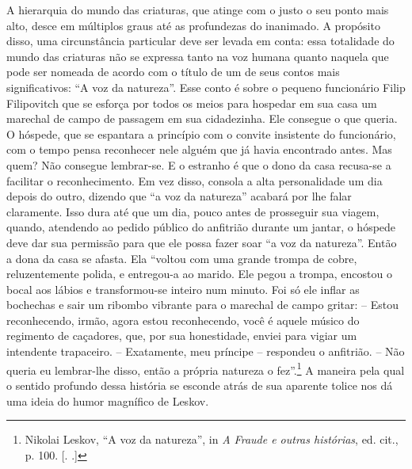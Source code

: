 A hierarquia do mundo das criaturas, que atinge com o justo o seu ponto
mais alto, desce em múltiplos graus até as profundezas do inanimado. A
propósito disso, uma circunstância particular deve ser levada em conta:
essa totalidade do mundo das criaturas não se expressa tanto na voz
humana quanto naquela que pode ser nomeada de acordo com o título de um
de seus contos mais significativos: ``A voz da natureza''. Esse conto é
sobre o pequeno funcionário Filip Filipovitch que se esforça por todos
os meios para hospedar em sua casa um marechal de campo de passagem em
sua cidadezinha. Ele consegue o que queria. O hóspede, que se espantara
a princípio com o convite insistente do funcionário, com o tempo pensa
reconhecer nele alguém que já havia encontrado antes. Mas quem? Não
consegue lembrar-se. E o estranho é que o dono da casa recusa-se a
facilitar o reconhecimento. Em vez disso, consola a alta personalidade
um dia depois do outro, dizendo que ``a voz da natureza'' acabará por
lhe falar claramente. Isso dura até que um dia, pouco antes de
prosseguir sua viagem, quando, atendendo ao pedido público do anfitrião
durante um jantar, o hóspede deve dar sua permissão para que ele possa
fazer soar ``a voz da natureza''. Então a dona da casa se afasta. Ela
``voltou com uma grande trompa de cobre, reluzentemente polida, e
entregou-a ao marido. Ele pegou a trompa, encostou o bocal aos lábios e
transformou-se inteiro num minuto. Foi só ele inflar as bochechas e sair
um ribombo vibrante para o marechal de campo gritar: -- Estou
reconhecendo, irmão, agora estou reconhecendo, você é aquele músico do
regimento de caçadores, que, por sua honestidade, enviei para vigiar um
intendente trapaceiro. -- Exatamente, meu príncipe -- respondeu o
anfitrião. -- Não queria eu lembrar-lhe disso, então a própria natureza
o fez''.\footnote{Nikolai Leskov, ``A voz da natureza'', in \emph{A
  Fraude e outras histórias}, ed. cit., p. 100. [. .]} A
maneira pela qual o sentido profundo dessa história se esconde atrás de
sua aparente tolice nos dá uma ideia do humor magnífico de Leskov.

